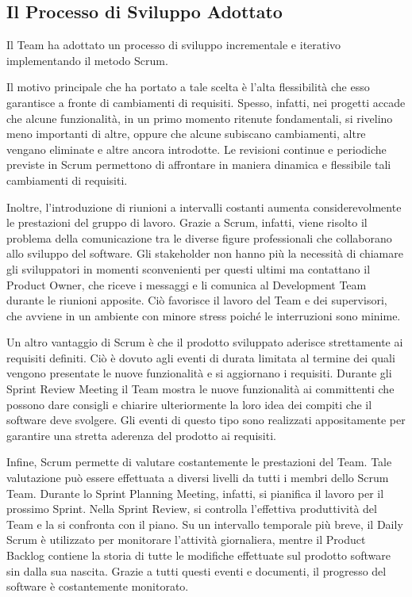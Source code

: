 			

		\subsection*{Il Processo di Sviluppo Adottato}
			Il Team ha adottato un processo di sviluppo incrementale e iterativo implementando il metodo Scrum.

			Il motivo principale che ha portato a tale scelta è l'alta flessibilità che esso garantisce a fronte di cambiamenti di requisiti.
			Spesso, infatti, nei progetti accade che alcune funzionalità, in un primo momento ritenute fondamentali, si rivelino meno importanti di altre, oppure che alcune subiscano cambiamenti, altre vengano eliminate e altre ancora introdotte.
			Le revisioni continue e periodiche previste in Scrum permettono di affrontare in maniera dinamica e flessibile tali cambiamenti di requisiti.
	
			Inoltre, l'introduzione di riunioni a intervalli costanti aumenta considerevolmente le prestazioni del gruppo di lavoro.
			Grazie a Scrum, infatti, viene risolto il problema della comunicazione tra le diverse figure professionali che collaborano allo sviluppo del software.  
			Gli stakeholder non hanno più la necessità di chiamare gli sviluppatori in momenti sconvenienti per questi ultimi ma contattano il Product Owner, che riceve i messaggi e li comunica al Development Team durante le riunioni apposite.
			Ciò favorisce il lavoro del Team e dei supervisori, che avviene in un ambiente con minore stress poiché le interruzioni sono minime.

			Un altro vantaggio di Scrum è che il prodotto sviluppato aderisce strettamente ai requisiti definiti.
			Ciò è dovuto agli eventi di durata limitata al termine dei quali vengono presentate le nuove funzionalità e si aggiornano i requisiti.
			Durante gli Sprint Review Meeting il Team mostra le nuove funzionalità ai committenti che possono dare consigli e chiarire ulteriormente la loro idea dei compiti che il software deve svolgere.
			Gli eventi di questo tipo sono realizzati appositamente per garantire una stretta aderenza del prodotto ai requisiti.

			Infine, Scrum permette di valutare costantemente le prestazioni del Team.
			Tale valutazione può essere effettuata a diversi livelli da tutti i membri dello Scrum Team.
			Durante lo Sprint Planning Meeting, infatti, si pianifica il lavoro per il prossimo Sprint.
			Nella Sprint Review, si controlla l'effettiva produttività del Team e la si confronta con il piano.
			Su un intervallo temporale più breve, il Daily Scrum è utilizzato per monitorare l'attività giornaliera, mentre il Product Backlog contiene la storia di tutte le modifiche effettuate sul prodotto software sin dalla sua nascita. 
			Grazie a tutti questi eventi e documenti, il progresso del software è costantemente monitorato. 
			
